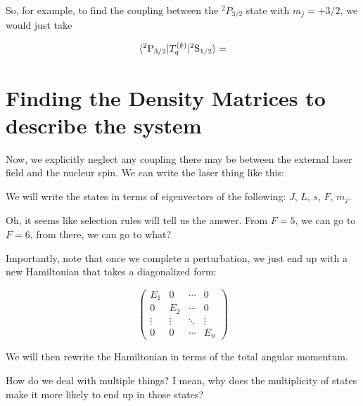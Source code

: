 So, for example, to find the coupling between the $^2 P_{3/2}$ state with $m_j=+3/2$, we would just take 

\begin{equation}
\langle ^2 \textnormal{P} _{3/2}|T_q^{(k)}|^2 \textnormal{S}_{1/2}\rangle = 
\end{equation}


\section{Finding the Density Matrices to describe the system}


Now, we explicitly neglect any coupling there may be between the external laser field and the nucleur spin. We can write the laser thing like this: 


We will write the states in terms of eigenvectors of the following: $J$, $L$, $s$, $F$, $m_j$.

Oh, it seems like selection rules will tell us the answer. From $F=5$, we can go to $F=6$, from there, we can go to what? 



Importantly, note that once we complete a perturbation, we just end up with a new Hamiltonian that takes a diagonalized form:

\begin{equation}
\begin{pmatrix}
E_1 & 0 & \cdots & 0 \\
0   & E_2 & \cdots & 0\\
\vdots&\vdots&\ddots & \vdots\\
0 & 0 & \cdots & E_n
\end{pmatrix}
\end{equation}

We will then rewrite the Hamiltonian in terms of the total angular momentum. 

How do we deal with multiple things? I mean, why does the multiplicity of states make it more likely to end up in those states? 

